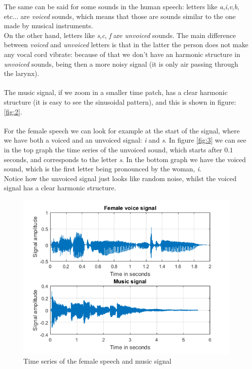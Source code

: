 The same can be said for some sounds in the human speech: letters like \textit{a},\textit{i},\textit{v},\textit{b}, etc... are \textit{voiced} sounds, which means that those are sounds similar to the one made by musical instruments.\\
On the other hand, letters like \textit{s},\textit{c}, \textit{f} are \textit{unvoiced} sounds. The main difference between \textit{voiced} and \textit{unvoiced} letters is that in the latter the person does not make any vocal cord vibrate: because of that we don't have an harmonic structure in \textit{unvoiced} sounds, being then a more noisy signal (it is only air passing through the larynx).\\ \\
The music signal, if we zoom in a smaller time patch, has a clear harmonic structure (it is easy to see the sinusoidal pattern), and this is shown in figure: \ref{fig:2}.\\ \\
For the female speech we can look for example at the start of the signal, where we have both a voiced and an unvoiced signal: \textit{i} and \textit{s}.
In figure \ref{fig:3} we can see in the top graph the time series of the unvoiced sound, which starts after $0.1$ seconds, and corresponds to the letter \textit{s}. In the bottom graph we have the voiced sound, which is the first letter being pronounced by the woman, \textit{i}.
\\Notice how the unvoiced signal just looks like random noise, whilst the voiced signal  has a clear harmonic structure.

\begin{figure}[h]
		\centering	\includegraphics[width=0.77\linewidth]{./images/music_female_time.png}
		\caption{Time series of the female speech and music signal}
		\label{fig:1}	
\end{figure}

